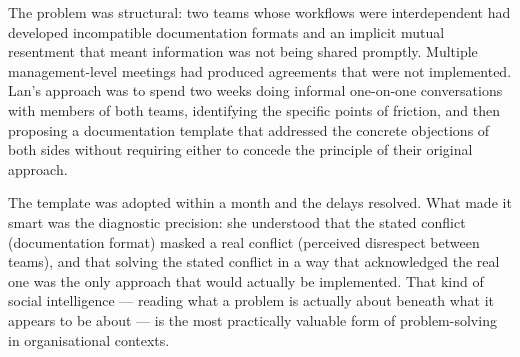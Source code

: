 \begin{ieltsanswer}
The problem was structural: two teams whose workflows were interdependent had developed incompatible documentation formats and an implicit mutual resentment that meant information was not being shared promptly. Multiple management-level meetings had produced agreements that were not implemented. Lan's approach was to spend two weeks doing informal one-on-one conversations with members of both teams, identifying the specific points of friction, and then proposing a documentation template that addressed the concrete objections of both sides without requiring either to concede the principle of their original approach.

The template was adopted within a month and the delays resolved. What made it smart was the diagnostic precision: she understood that the stated conflict (documentation format) masked a real conflict (perceived disrespect between teams), and that solving the stated conflict in a way that acknowledged the real one was the only approach that would actually be implemented. That kind of social intelligence — reading what a problem is actually about beneath what it appears to be about — is the most practically valuable form of problem-solving in organisational contexts.
\end{ieltsanswer}


